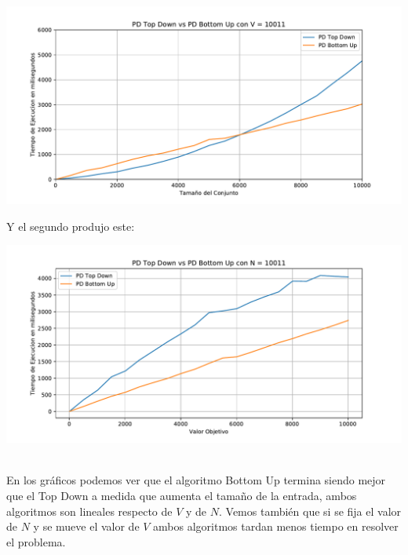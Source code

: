 \documentclass[a4paper]{article}
\begin{document}
\begin{center}
	\includegraphics[width=.8\linewidth]{G12.pdf}
\end{center}

Y el segundo produjo este:

\begin{center}
	\includegraphics[width=.8\linewidth]{G13.pdf}
\end{center}

\\

En los gráficos podemos ver que el algoritmo Bottom Up termina siendo mejor que el Top Down a medida que aumenta el tamaño de la entrada, ambos algoritmos son lineales respecto de $V$ y de $N$. Vemos también que si se fija el valor de $N$ y se mueve el valor de $V$ ambos algoritmos tardan menos tiempo en resolver el problema.
\end{document}
